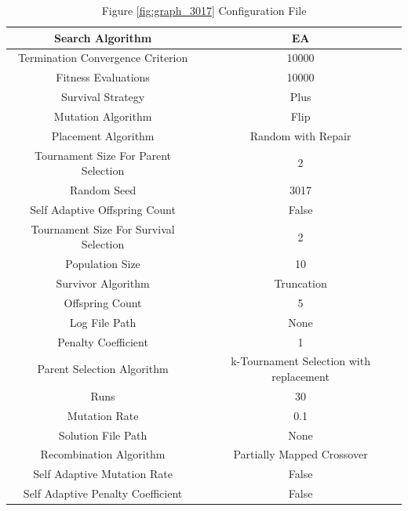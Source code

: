 \documentclass{standalone}
\begin{document}
\begin{table}[!htb]
	\centering
	\caption{Figure \ref{fig:graph_3017} Configuration File}
	\label{tab:graph_3017}
	\begin{tabular}{| c | c |}
		\hline
		Search Algorithm		& EA		 \\
		\hline
		Termination Convergence Criterion		& 10000		 \\
		\hline
		Fitness Evaluations		& 10000		 \\
		\hline
		Survival Strategy		& Plus		 \\
		\hline
		Mutation Algorithm		& Flip		 \\
		\hline
		Placement Algorithm		& Random with Repair		 \\
		\hline
		Tournament Size For Parent Selection		& 2		 \\
		\hline
		Random Seed		& 3017		 \\
		\hline
		Self Adaptive Offspring Count		& False		 \\
		\hline
		Tournament Size For Survival Selection		& 2		 \\
		\hline
		Population Size		& 10		 \\
		\hline
		Survivor Algorithm		& Truncation		 \\
		\hline
		Offspring Count		& 5		 \\
		\hline
		Log File Path		& None		 \\
		\hline
		Penalty Coefficient		& 1		 \\
		\hline
		Parent Selection Algorithm		& k-Tournament Selection with replacement		 \\
		\hline
		Runs		& 30		 \\
		\hline
		Mutation Rate		& 0.1		 \\
		\hline
		Solution File Path		& None		 \\
		\hline
		Recombination Algorithm		& Partially Mapped Crossover		 \\
		\hline
		Self Adaptive Mutation Rate		& False		 \\
		\hline
		Self Adaptive Penalty Coefficient		& False		 \\
		\hline
	\end{tabular}
\end{table}
\end{document}
